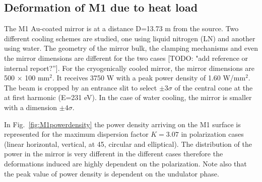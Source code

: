 \documentclass[]{spie}  %
\newcommand{\todo}[1]{{\color{red}[TODO: "#1'']}}
\begin{document}
\subsection{Deformation of M1 due to heat load}

The M1 Au-coated mirror is at a distance D=13.73 m from the source. Two different cooling schemes are studied, one using liquid nitrogen (LN) and another using water. The geometry of the mirror bulk, the clamping mechanisms and even the mirror dimensions are different for the two cases \todo{add reference or internal report?}. For the cryogenically cooled mirror, the mirror dimensions are 500 $\times$ 100 mm$^2$. It receives 3750 W with a peak power density of 1.60 W/mm$^2$. The beam is cropped by an entrance slit to select $\pm 3 \sigma$ of the central cone at the at first harmonic (E=231 eV). In the case of water cooling, the mirror is smaller with a dimension $\pm 4 \sigma$. 

In Fig.~\ref{fig:M1powerdensity} the power density arriving on the M1 surface is represented for the maximum dispersion factor $K=3.07$ in polarization cases (linear horizontal, vertical, at 45\textdegree, circular and elliptical). The distribution of the power in the mirror is very different in the different cases therefore the deformations induced are highly dependent on the polarization. Note also that the peak value of power density is dependent on the undulator phase.
\end{document}
